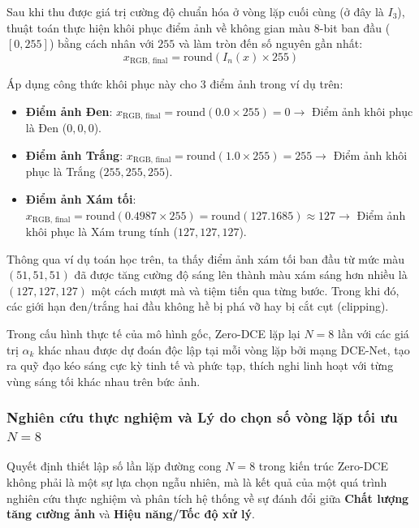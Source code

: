 \documentclass[a4paper]{article}
\begin{document}
Sau khi thu được giá trị cường độ chuẩn hóa ở vòng lặp cuối cùng (ở đây là $I_3$), thuật toán thực hiện khôi phục điểm ảnh về không gian màu 8-bit ban đầu ($[0, 255]$) bằng cách nhân với $255$ và làm tròn đến số nguyên gần nhất:
\begin{equation}
    x_{\text{RGB, final}} = \text{round}(I_n(x) \times 255)
\end{equation}

Áp dụng công thức khôi phục này cho 3 điểm ảnh trong ví dụ trên:
\begin{itemize}
    \item \textbf{Điểm ảnh Đen}: $x_{\text{RGB, final}} = \text{round}(0.0 \times 255) = 0 \rightarrow$ Điểm ảnh khôi phục là Đen ($0, 0, 0$).
    \item \textbf{Điểm ảnh Trắng}: $x_{\text{RGB, final}} = \text{round}(1.0 \times 255) = 255 \rightarrow$ Điểm ảnh khôi phục là Trắng ($255, 255, 255$).
    \item \textbf{Điểm ảnh Xám tối}: $x_{\text{RGB, final}} = \text{round}(0.4987 \times 255) = \text{round}(127.1685) \approx 127 \rightarrow$ Điểm ảnh khôi phục là Xám trung tính ($127, 127, 127$).
\end{itemize}

Thông qua ví dụ toán học trên, ta thấy điểm ảnh xám tối ban đầu từ mức màu $(51, 51, 51)$ đã được tăng cường độ sáng lên thành màu xám sáng hơn nhiều là $(127, 127, 127)$ một cách mượt mà và tiệm tiến qua từng bước. Trong khi đó, các giới hạn đen/trắng hai đầu không hề bị phá vỡ hay bị cắt cụt (clipping). 

Trong cấu hình thực tế của mô hình gốc, Zero-DCE lặp lại $N=8$ lần với các giá trị $\alpha_k$ khác nhau được dự đoán độc lập tại mỗi vòng lặp bởi mạng DCE-Net, tạo ra quỹ đạo kéo sáng cực kỳ tinh tế và phức tạp, thích nghi linh hoạt với từng vùng sáng tối khác nhau trên bức ảnh.

\subsubsection{Nghiên cứu thực nghiệm và Lý do chọn số vòng lặp tối ưu $N = 8$}
Quyết định thiết lập số lần lặp đường cong $N = 8$ trong kiến trúc Zero-DCE không phải là một sự lựa chọn ngẫu nhiên, mà là kết quả của một quá trình nghiên cứu thực nghiệm và phân tích hệ thống về sự đánh đổi giữa \textbf{Chất lượng tăng cường ảnh} và \textbf{Hiệu năng/Tốc độ xử lý}.
\end{document}
